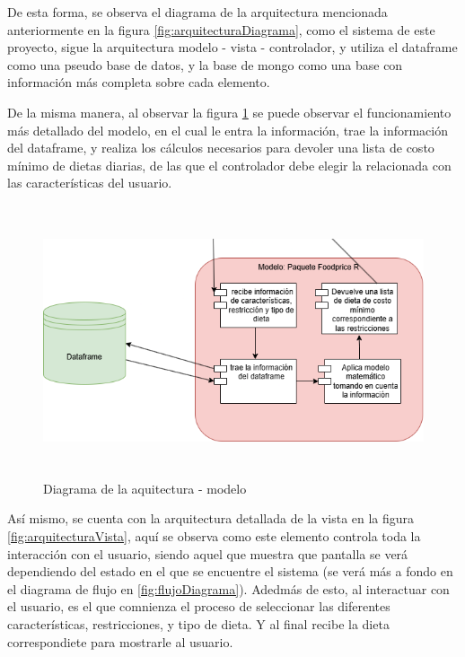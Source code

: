 \noindent De esta forma, se observa el diagrama de la arquitectura mencionada anteriormente en la figura \ref{fig:arquitecturaDiagrama}, como el sistema de este proyecto, sigue la arquitectura modelo - vista - controlador, y utiliza el dataframe como una pseudo base de datos, y la base de mongo como una base con informaci\'on m\'as completa sobre cada elemento.

\noindent De la misma manera, al observar la figura \ref{fig:arquitecturaModelo} se puede observar el funcionamiento m\'as detallado del modelo, en el cual le entra la informaci\'on, trae la informaci\'on del dataframe, y realiza los c\'alculos necesarios para devoler una lista de costo m\'inimo de dietas diarias, de las que el controlador debe elegir la relacionada con las caracter\'isticas del usuario.

\begin{figure}[H]
        \centering
        \includegraphics[height=8cm]{img/Diseno/arquitectura modelo.png}
        \caption{Diagrama de la aquitectura - modelo}
        \label{fig:arquitecturaModelo}
    \end{figure}

\noindent As\'i mismo, se cuenta con la arquitectura detallada de la vista en la figura \ref{fig:arquitecturaVista}, aqu\'i se observa  como este elemento  controla toda la interacci\'on con el usuario, siendo aquel que muestra que pantalla se ver\'a dependiendo del estado en el que se encuentre el sistema (se ver\'a m\'as a fondo en el diagrama de flujo en \ref{fig:flujoDiagrama}). Adedm\'as de esto, al interactuar con el usuario, es el que comnienza el proceso de seleccionar las diferentes caracter\'isticas, restricciones, y tipo de dieta. Y al final recibe la dieta correspondiete para mostrarle al usuario.

